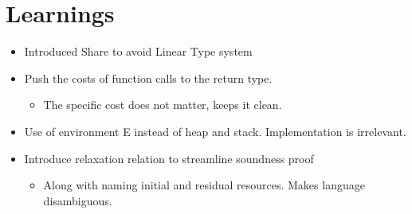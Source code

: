\section{Learnings}
\begin{itemize}
	\item Introduced Share to avoid Linear Type system
	\item Push the costs of function calls to the return type. 
	   \begin{itemize}
	   	\item The specific cost does not matter, keeps it clean.
	   \end{itemize}
	\item Use of environment E instead of heap and stack. Implementation is irrelevant.
	\item Introduce relaxation relation to streamline soundness proof
	\begin{itemize}
		\item Along with naming initial and residual resources. Makes language disambiguous.
	\end{itemize}
\end{itemize}
